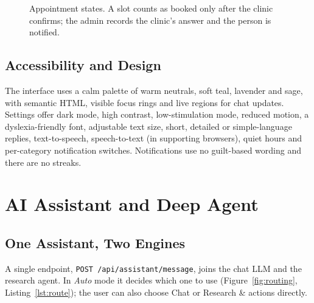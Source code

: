 \documentclass[11pt,a4paper]{article}
\newcommand{\code}[1]{\texttt{#1}}
\begin{document}
\begin{figure}[H]
\centering
{}
\caption{Appointment states. A slot counts as booked only after the clinic confirms; the admin records the clinic's answer and the person is notified.}
\label{fig:appt}
\end{figure}

\subsection{Accessibility and Design}
The interface uses a calm palette of warm neutrals, soft teal, lavender and sage, with semantic
HTML, visible focus rings and live regions for chat updates. Settings offer dark mode, high contrast,
low-stimulation mode, reduced motion, a dyslexia-friendly font, adjustable text size, short, detailed
or simple-language replies, text-to-speech, speech-to-text (in supporting browsers), quiet hours and
per-category notification switches. Notifications use no guilt-based wording and there are no streaks.

\section{AI Assistant and Deep Agent}\label{sec:agent}

\subsection{One Assistant, Two Engines}
A single endpoint, \code{POST /api/assistant/message}, joins the chat LLM and the research agent.
In \emph{Auto} mode it decides which one to use (Figure~\ref{fig:routing}, Listing~\ref{lst:route});
the user can also choose Chat or Research \& actions directly.
\end{document}
